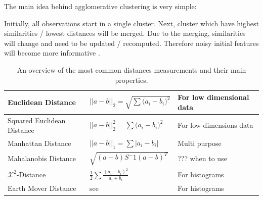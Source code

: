 The main idea behind agglomerative clustering is very simple:

Initially, all observations start in a single cluster. 
Next, cluster which have highest similarities / lowest distances will be merged.
Due to the merging, similarities will change and need to be updated
/ recomputed. Therefore  noisy initial features
will  become more informative .


\begin{table}
\begin{scriptsize}
\begin{tabular}{ |l|l|p{5cm}|}
    \hline 
    Euclidean Distance
        & $||a-b||_2 = \sqrt{\sum{ (a_i-b_i })^2 } $
        & For low dimensional data \\  \hline 
    Squared Euclidean Distance
        & $||a-b||_2^2 = \sum{ (a_i-b_i })^2  $
        & For low dimensions data\\  \hline
    Manhattan Distance
        &  $||a-b||_1 = \sum{ |a_i-b_i |}  $
        & Multi purpose \\  \hline 
    Mahalanobis Distance 
        & $\sqrt{(a-b)S^-1(a-b)^T}$
        & ??? when to use \\  \hline 
    $\mathcal{X}^2$-Distance  
        &  $\frac{1}{2}\sum{  \frac{(a_i-b_i)^2}{a_i+b_i} }$
        & For histograms \\  \hline 
    Earth Mover  Distance          
        &  see \citet{levina_2001_iccv} 
        & For histograms \\  \hline 

\end{tabular}

\end{scriptsize}
\caption{
    An overview of the most common distances measurements and their main properties.
}\label{tab:hc_distance_types}
\end{table}




